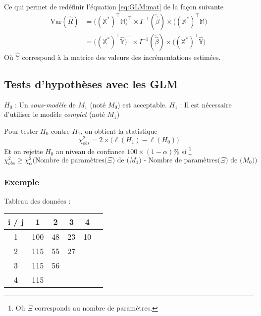 Ce qui permet de redéfinir l'équation \ref{eq:GLM:mat} de la façon suivante
\begin{align*}
\text{Var}(\widehat{R}) &= \big( (\mathbb{X}^*)^\intercal \mathbb{M} \big)^\intercal \times I^{-1}(\utilde{\widehat{\beta}}) \times \big( (\mathbb{X}^*)^\intercal \mathbb{M} \big) \\
&= \big( (\mathbb{X}^*)^\intercal \mathbb{\widehat{Y}} \big)^\intercal \times I^{-1}(\utilde{\widehat{\beta}}) \times \big( (\mathbb{X}^*)^\intercal \mathbb{\widehat{Y}} \big)
\end{align*}
Où $\mathbb{\widehat{Y}}$ correspond à la matrice des valeurs des incrémentations estimées.


\subsection*{Tests d'hypothèses avec les GLM}
$H_0$ : Un \textit{sous-modèle} de $M_1$ (noté $M_0$) est acceptable. \newline
$H_1$ : Il est nécessaire d'utiliser le modèle \textit{complet} (noté $M_1$)

Pour tester $H_0$ contre $H_1$, on obtient la statistique 
\begin{equation}
\label{eq:chisquare}
\chi_{obs}^2 = 2 \times \Big( \ell(H_1) - \ell(H_0) \Big)
\end{equation}
Et on rejette $H_0$ au niveau de confiance $100 \times (1 - \alpha) \%$ si \footnote{Où $\Xi$ corresponds au nombre de paramètres.}
\begin{equation}
\label{eq:test:chi}
\chi_{obs}^2 \geq \chi_{\alpha}^2\Big( \text{Nombre de paramètres($\Xi$) de ($M_1$) - Nombre de paramètres($\Xi$) de ($M_0$)} \Big)
\end{equation}


\subsubsection*{Exemple}
Tableau des données : \\
\begin{center}
\begin{tabular}{|c|c|c|c|c|c|}
  \hline
   i / j & 1 & 2  & 3 & 4 \\
  \hline
  1 & 100 & 48 & 23 & 10 \\
  2 & 115 & 55 & 27 &   \\
  3 & 115 & 56 & &   \\
  4 & 115 &  &  &  \\
  \hline
\end{tabular}
\end{center}
\bigskip

